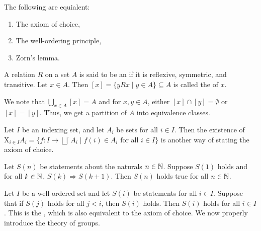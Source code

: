 \begin{theorem}
    The following are equialent:
    \begin{enumerate}
        \item The axiom of choice,
        \item The well-ordering principle,
        \item Zorn's lemma.
    \end{enumerate}
\end{theorem}

\begin{definition}
    A relation $R$ on a set $A$ is said to be an  if it is reflexive, symmetric, and transitive. Let $x \in A$. Then $[x] = \{yRx \mid y \in A\} \subseteq A$ is called the  of $x$.
\end{definition}

We note that $\bigcup_{x \in A} [x] = A$ and for $x,y \in A$, either $[x] \cap [y] = \emptyset$ or $[x] = [y]$. Thus, we get a partition of $A$ into equivalence classes.

Let $I$ be an indexing set, and let $A_{i}$ be sets for all $i \in I$. Then the existence of $\text{X}_{i \in I} A_{i} = \{f:I \to \overset{\cdot}{\bigsqcup} A_{i} \mid f(i) \in A_{i} \text{ for all } i \in I\}$ is another way of stating the axiom of choice.

\begin{theorem}
    Let $S(n)$ be statements about the naturals $n \in \mathbb{N}$. Suppose $S(1)$ holds and for all $k \in \mathbb{N}$, $S(k) \Rightarrow S(k+1)$. Then $S(n)$ holds true for all $n \in \mathbb{N}$.
\end{theorem}

Let $I$ be a well-ordered set and let $S(i)$ be statements for all $i \in I$. Suppose that if $S(j)$ holds for all $j < i$, then $S(i)$ holds. Then $S(i)$ holds for all $i \in I$. This is the , which is also equivalent to the axiom of choice. We now properly introduce the theory of groups.

